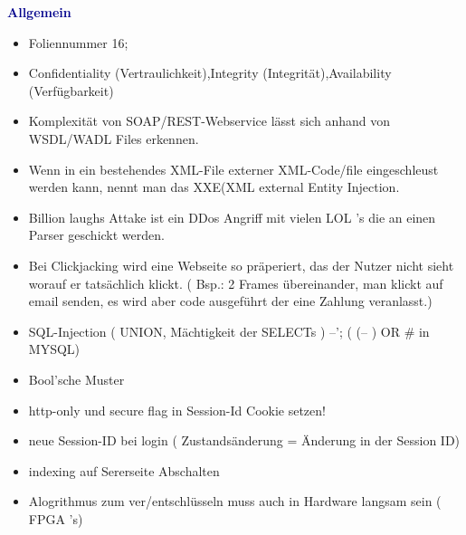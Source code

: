 \textbf{\textcolor{darkblue}{ Allgemein}}~
	\begin{itemize}
		
	\item Foliennummer 16;
	\item Confidentiality (Vertraulichkeit),Integrity (Integrität),Availability (Verfügbarkeit)
	\item Komplexität von SOAP/REST-Webservice lässt sich anhand von WSDL/WADL Files erkennen.
	\item Wenn in ein bestehendes XML-File externer XML-Code/file eingeschleust werden kann, nennt man das XXE(XML external Entity Injection.
	\item Billion laughs Attake ist ein DDos Angriff mit vielen LOL \'{ '}s die an einen Parser geschickt werden.
	\item Bei Clickjacking wird eine Webseite so präperiert, das der Nutzer nicht sieht worauf er tatsächlich klickt. ( Bsp.: 2 Frames übereinander, man klickt auf email senden, es wird aber code ausgeführt der eine Zahlung veranlasst.)
	\item SQL-Injection ( UNION, Mächtigkeit der SELECTs ) --'; ( (-- ) OR \# in MYSQL)
	\item Bool'sche Muster
	\item http-only und secure flag in Session-Id Cookie setzen!
	\item  neue Session-ID bei login ( Zustandsänderung = Änderung in der Session ID)
	\item  indexing auf Sererseite Abschalten
	\item Alogrithmus zum ver/entschlüsseln muss auch in Hardware langsam sein ( FPGA\'{ '}s)
	
	\end{itemize}














